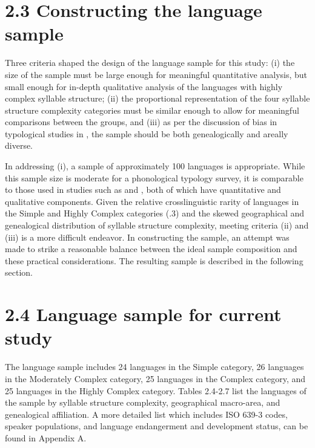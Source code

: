 \section{2.3 Constructing the language sample}

  Three criteria shaped the design of the language sample for this study: (i) the size of the sample must be large enough for meaningful quantitative analysis, but small enough for in-depth qualitative analysis of the languages with highly complex syllable structure; (ii) the proportional representation of the four syllable structure complexity categories must be similar enough to allow for meaningful comparisons between the groups, and (iii) as per the discussion of bias in typological studies in , the sample should be both genealogically and areally diverse.



  In addressing (i), a sample of approximately 100 languages is appropriate. While this sample size is moderate for a phonological typology survey, it is comparable to those used in studies such as \citet{Bateman2007} and \citet{BybeeEasterday2019}, both of which have quantitative and qualitative components. Given the relative crosslinguistic rarity of languages in the Simple and Highly Complex categories (.3) and the skewed geographical and genealogical distribution of syllable structure complexity, meeting criteria (ii) and (iii) is a more difficult endeavor. In constructing the sample, an attempt was made to strike a reasonable balance between the ideal sample composition and these practical considerations. The resulting sample is described in the following section.


\section{\rmfamily} 
\section{2.4 Language sample for current study}

  The language sample includes 24 languages in the Simple category, 26 languages in the Moderately Complex category, 25 languages in the Complex category, and 25 languages in the Highly Complex category. Tables 2.4-2.7 list the languages of the sample by syllable structure complexity, geographical macro-area, and genealogical affiliation. A more detailed list which includes ISO 639-3 codes, speaker populations, and language endangerment and development status, can be found in Appendix A.







